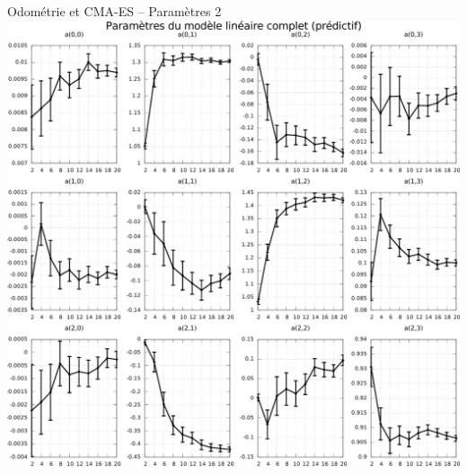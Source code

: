 \begin{frame}[noframenumbering]{Odométrie et CMA-ES -- Paramètres 2}
    \centering
    \includegraphics[type=pdf,ext=.pdf,read=.pdf,height=0.85\textheight]{../plot/OdometryCMAES/parametersFullOrders}
\end{frame}

